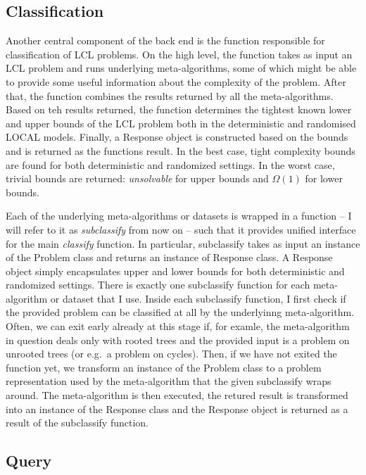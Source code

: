 \subsection{Classification}

Another central component of the back end is
the function responsible for classification of LCL problems.
On the high level, the function takes as input an LCL problem and
runs underlying meta-algorithms, some of which might be
able to provide some useful information about the complexity of the
problem. After that, the function combines the results
returned by all the meta-algorithms. Based on teh results returned,
the function determines the tightest known lower and upper bounds of
the LCL problem both in the deterministic and randomised LOCAL
models. Finally, a Response object is constructed based on the bounds
and is returned as the functions result. In the best case, tight
complexity bounds are found for both deterministic and randomized
settings. In the worst case, trivial bounds are returned:
\emph{unsolvable} for upper bounds and $\Omega(1)$ for lower bounds.

Each of the underlying meta-algorithms or datasets is wrapped
in a function -- I will refer to it as \emph{subclassify} from now on -- such
that it provides unified interface for the main
\emph{classify} function. In particular, subclassify takes
as input an instance of the Problem class and
returns an instance of Response class. A Response object
simply encapsulates upper and lower bounds for both
deterministic and randomized settings. There is
exactly one subclassify function for each meta-algorithm
or dataset that I use. Inside each subclassify function,
I first check if the provided problem can be classified
at all by the underlyinng meta-algorithm. Often, we can
exit early already at this stage if, for examle, the meta-algorithm
in question deals only with rooted trees and the provided input is a 
problem on unrooted trees (or e.g.\ a problem on cycles). Then,
if we have not exited the function yet,
we transform an instance of the Problem class to a problem
representation used by the meta-algorithm that the given
subclassify wraps around. The meta-algorithm is then executed,
the retured result is transformed into an instance of the
Response class and the Response object is returned as
a result of the subclassify function.

\subsection{Query}

